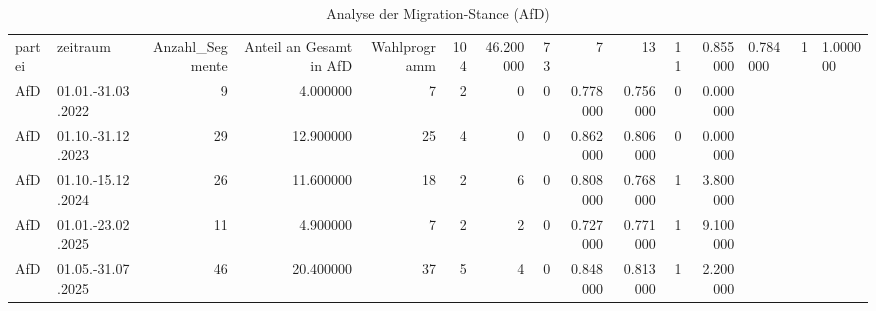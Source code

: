\begin{table}
\caption{Analyse der Migration-Stance (AfD)}
\label{tab:meine_tabelle}
\begin{tabular}{llrrrrrrrrrr}
\toprule
partei & zeitraum & Anzahl_Segmente & Anteil an Gesamt in %
\midrule
AfD & Wahlprogramm & 104 & 46.200000 & 73 & 7 & 13 & 11 & 0.855000 & 0.784000 & 1 & 1.000000 \\
AfD & 01.01.-31.03.2022 & 9 & 4.000000 & 7 & 2 & 0 & 0 & 0.778000 & 0.756000 & 0 & 0.000000 \\
AfD & 01.10.-31.12.2023 & 29 & 12.900000 & 25 & 4 & 0 & 0 & 0.862000 & 0.806000 & 0 & 0.000000 \\
AfD & 01.10.-15.12.2024 & 26 & 11.600000 & 18 & 2 & 6 & 0 & 0.808000 & 0.768000 & 1 & 3.800000 \\
AfD & 01.01.-23.02.2025 & 11 & 4.900000 & 7 & 2 & 2 & 0 & 0.727000 & 0.771000 & 1 & 9.100000 \\
AfD & 01.05.-31.07.2025 & 46 & 20.400000 & 37 & 5 & 4 & 0 & 0.848000 & 0.813000 & 1 & 2.200000 \\
\bottomrule
\end{tabular}
\end{table}
